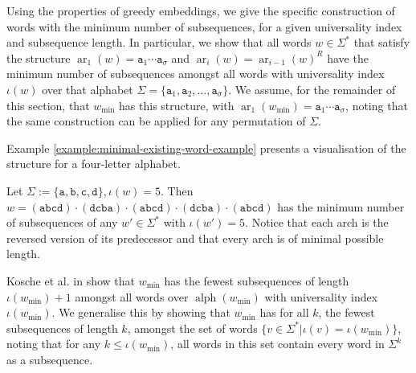 \documentclass[runningheads,UKenglish,cleveref, autoref, thm-restate]{llncs}
\def\ta{\mathtt{a}}
\def\tb{\mathtt{b}}
\def\tc{\mathtt{c}}
\def\td{\mathtt{d}}
\DeclareMathOperator{\arch}{ar}
\DeclareMathOperator{\alphabet}{alph}
\DeclareMathOperator\ScatFact{SubSeq}
\newif\ifpaper
\begin{document}
Using the properties of greedy embeddings, we give the specific construction of words with the minimum number of subsequences, for a given universality index and subsequence length. In particular, we show that all words $w\in\Sigma^*$ that satisfy the structure $\arch_1(w) = \ta_1 \cdots \ta_\sigma$ and $\arch_i(w) = \arch_{i-1}(w)^R$ have the minimum number of subsequences amongst all words with universality index $\iota(w)$ over that alphabet $\Sigma = \{ \ta_1, \ta_2, \dots , \ta_\sigma\}$. We assume, for the remainder of this section, that $w_{\min}$ has this structure, with $\arch_1(w_{\min}) = \ta_1 \cdots \ta_\sigma$, noting that the same construction can be applied for any permutation of $\Sigma$. 
\ifpaper
\else
Example \ref{example:minimal-existing-word-example} presents a visualisation of the structure for a four-letter alphabet.
\begin{example}\label{example:minimal-existing-word-example}
    Let $\Sigma := \{\ta,\tb,\tc,\td\}, \iota(w) = 5$. Then
    $w =( \ta\tb\tc\td) \cdot (\td\tc\tb\ta)\cdot (\ta\tb\tc\td)\cdot (\td\tc\tb\ta)\cdot (\ta\tb\tc\td)$
    has the minimum number of subsequences of any $w' \in \Sigma^*$ with $\iota(w') =5$.
    Notice that each arch is the reversed version of its predecessor and that every arch is of minimal possible length.
\end{example}
\fi
Kosche et al. in \cite{DBLP:journals/fuin/KoscheKMS22} show that $w_{\min}$ has the fewest subsequences of length $\iota(w_{\min}) + 1$ amongst all words over $\alphabet(w_{\min})$ with universality index $\iota(w_{\min})$. We generalise this by showing that $w_{\min}$ has for all $k$, the fewest subsequences of length $k$, amongst the set of words $\{v \in \Sigma^* \vert \iota(v) = \iota(w_{\min}) \}$, noting that for any $k \leq \iota(w_{\min})$, all words in this set contain every word in $\Sigma^k$ as a subsequence.
%
\end{document}
